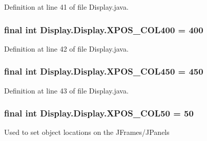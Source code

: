 Definition at line 41 of file Display.\+java.

\hypertarget{class_display_1_1_display_a2b04669828dc32ce7435f60985fb9e15}{}
\subsubsection[{X\+P\+O\+S\+\_\+\+C\+O\+L400}]{\setlength{\rightskip}{0pt plus 5cm}final int Display.\+Display.\+X\+P\+O\+S\+\_\+\+C\+O\+L400 = 400\hspace{0.3cm}{\ttfamily [static]}}\label{class_display_1_1_display_a2b04669828dc32ce7435f60985fb9e15}


Definition at line 42 of file Display.\+java.

\hypertarget{class_display_1_1_display_aaa4a147d3ae20ff69293868c15b0810c}{}
\subsubsection[{X\+P\+O\+S\+\_\+\+C\+O\+L450}]{\setlength{\rightskip}{0pt plus 5cm}final int Display.\+Display.\+X\+P\+O\+S\+\_\+\+C\+O\+L450 = 450\hspace{0.3cm}{\ttfamily [static]}}\label{class_display_1_1_display_aaa4a147d3ae20ff69293868c15b0810c}


Definition at line 43 of file Display.\+java.

\hypertarget{class_display_1_1_display_a044af84b350b1be71c612ab3b534e24d}{}
\subsubsection[{X\+P\+O\+S\+\_\+\+C\+O\+L50}]{\setlength{\rightskip}{0pt plus 5cm}final int Display.\+Display.\+X\+P\+O\+S\+\_\+\+C\+O\+L50 = 50\hspace{0.3cm}{\ttfamily [static]}}\label{class_display_1_1_display_a044af84b350b1be71c612ab3b534e24d}
Used to set object locations on the J\+Frames/\+J\+Panels 

